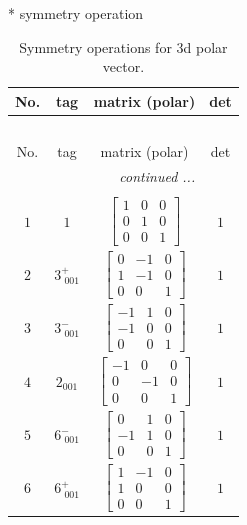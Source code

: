 \documentclass[fleqn,8pt]{jsarticle}
\begin{document}
* symmetry operation
\renewcommand{\arraystretch}{1.3}
\begin{longtable}{cccc}
\caption{Symmetry operations for 3d polar vector.}
 \\
 \hline \hline
No. & tag & matrix (polar) & det \\ \hline \endfirsthead

\multicolumn{3}{l}{\tablename\ \thetable{}} \\
 \hline \hline
No. & tag & matrix (polar) & det \\ \hline \endhead

 \hline \hline
\multicolumn{3}{r}{\footnotesize\it continued ...} \\ \endfoot

 \hline \hline
\multicolumn{3}{r}{} \\ \endlastfoot

$ 1 $ & $ 1 $ & $ \begin{bmatrix} 1 & 0 & 0 \\ 0 & 1 & 0 \\ 0 & 0 & 1 \end{bmatrix} $ & $ 1 $ \\ \hline
$ 2 $ & $ 3^{+}_{\,\,001} $ & $ \begin{bmatrix} 0 & -1 & 0 \\ 1 & -1 & 0 \\ 0 & 0 & 1 \end{bmatrix} $ & $ 1 $ \\ \hline
$ 3 $ & $ 3^{-}_{\,\,001} $ & $ \begin{bmatrix} -1 & 1 & 0 \\ -1 & 0 & 0 \\ 0 & 0 & 1 \end{bmatrix} $ & $ 1 $ \\ \hline
$ 4 $ & $ 2{}_{001} $ & $ \begin{bmatrix} -1 & 0 & 0 \\ 0 & -1 & 0 \\ 0 & 0 & 1 \end{bmatrix} $ & $ 1 $ \\ \hline
$ 5 $ & $ 6^{-}_{\,\,001} $ & $ \begin{bmatrix} 0 & 1 & 0 \\ -1 & 1 & 0 \\ 0 & 0 & 1 \end{bmatrix} $ & $ 1 $ \\ \hline
$ 6 $ & $ 6^{+}_{\,\,001} $ & $ \begin{bmatrix} 1 & -1 & 0 \\ 1 & 0 & 0 \\ 0 & 0 & 1 \end{bmatrix} $ & $ 1 $ \\
\end{longtable}
\end{document}
